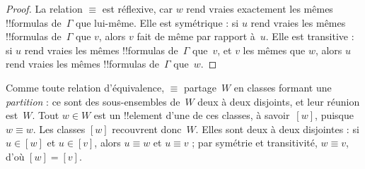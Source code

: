 \documentclass[../../../include/open-logic-section]{subfiles}
\begin{document}
\begin{proof}
  La relation $\equiv$ est réflexive, car $w$ rend vraies exactement
  les mêmes !!{formula}s de~$\Gamma$ que lui-même. Elle est symétrique :
  si $u$ rend vraies les mêmes !!{formula}s de~$\Gamma$ que $v$,
  alors $v$ fait de même par rapport à~$u$. Elle est transitive : si
  $u$ rend vraies les mêmes !!{formula}s de~$\Gamma$ que~$v$, et $v$
  les mêmes que $w$, alors $u$ rend vraies les mêmes !!{formula}s
  de~$\Gamma$ que~$w$.
\end{proof}

Comme toute relation d'équivalence, $\equiv$ partage~$W$ en classes
formant une \emph{partition} : ce sont des sous-ensembles de~$W$ deux
à deux disjoints, et leur réunion est~$W$. Tout $w \in W$ est un !!{element} d'une de ces
classes, à savoir~$[w]$, puisque $w \equiv w$. Les classes $[w]$
recouvrent donc~$W$. Elles sont deux à deux disjointes : si
$u \in [w]$ et $u \in [v]$, alors $u \equiv w$ et $u \equiv v$ ; par
symétrie et transitivité, $w \equiv v$, d'où $[w] = [v]$.
\end{document}
